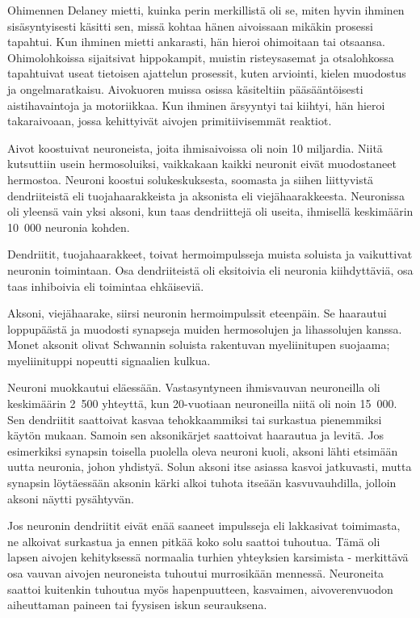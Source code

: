 Ohimennen Delaney mietti, kuinka perin merkillistä oli se, miten hyvin ihminen sisäsyntyisesti käsitti sen, missä kohtaa hänen aivoissaan mikäkin prosessi tapahtui. Kun ihminen mietti ankarasti, hän hieroi ohimoitaan tai otsaansa. Ohimolohkoissa sijaitsivat hippokampit, muistin risteysasemat ja otsalohkossa tapahtuivat useat tietoisen ajattelun prosessit, kuten arviointi, kielen muodostus ja ongelmaratkaisu. Aivokuoren muissa osissa käsiteltiin pääsääntöisesti aistihavaintoja ja motoriikkaa. Kun ihminen ärsyyntyi tai kiihtyi, hän hieroi takaraivoaan, jossa kehittyivät aivojen primitiivisemmät reaktiot.


Aivot koostuivat neuroneista, joita ihmisaivoissa oli noin 10 miljardia. Niitä kutsuttiin usein hermosoluiksi, vaikkakaan kaikki neuronit eivät muodostaneet hermostoa. Neuroni koostui solukeskuksesta, soomasta ja siihen liittyvistä dendriiteistä eli tuojahaarakkeista ja aksonista eli viejähaarakkeesta. Neuronissa oli yleensä vain yksi aksoni, kun taas dendriittejä oli useita, ihmisellä keskimäärin 10~000 neuronia kohden.


Dendriitit, tuojahaarakkeet, toivat hermoimpulsseja muista soluista ja vaikuttivat neuronin toimintaan. Osa dendriiteistä oli eksitoivia eli neuronia kiihdyttäviä, osa taas inhiboivia eli toimintaa ehkäiseviä.


Aksoni, viejähaarake, siirsi neuronin hermoimpulssit eteenpäin. Se haarautui loppupäästä ja muodosti synapseja muiden hermosolujen ja lihassolujen kanssa. Monet aksonit olivat Schwannin soluista rakentuvan myeliinitupen suojaama; myeliinituppi nopeutti signaalien kulkua.


Neuroni muokkautui eläessään. Vastasyntyneen ihmisvauvan neuroneilla oli keskimäärin 2~500 yhteyttä, kun 20-vuotiaan neuroneilla niitä oli noin 15~000. Sen dendriitit saattoivat kasvaa tehokkaammiksi tai surkastua pienemmiksi käytön mukaan. Samoin sen aksonikärjet saattoivat haarautua ja levitä. Jos esimerkiksi synapsin toisella puolella oleva neuroni kuoli, aksoni lähti etsimään uutta neuronia, johon yhdistyä. Solun aksoni itse asiassa kasvoi jatkuvasti, mutta synapsin löytäessään aksonin kärki alkoi tuhota itseään kasvuvauhdilla, jolloin aksoni näytti pysähtyvän.


Jos neuronin dendriitit eivät enää saaneet impulsseja eli lakkasivat toimimasta, ne alkoivat surkastua ja ennen pitkää koko solu saattoi tuhoutua. Tämä oli lapsen aivojen kehityksessä normaalia turhien yhteyksien karsimista - merkittävä osa vauvan aivojen neuroneista tuhoutui murrosikään mennessä. Neuroneita saattoi kuitenkin tuhoutua myös hapenpuutteen, kasvaimen, aivoverenvuodon aiheuttaman paineen tai fyysisen iskun seurauksena.


